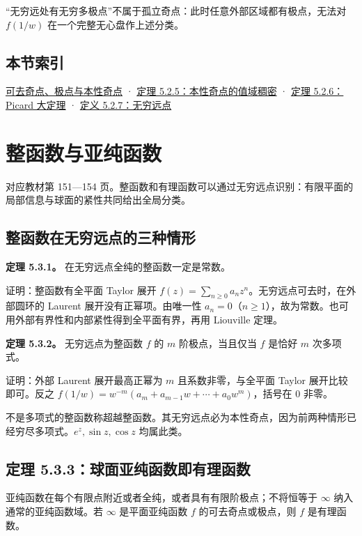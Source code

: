 \documentclass[11pt,a4paper]{article}
\begin{document}
``无穷远处有无穷多极点''不属于孤立奇点：此时任意外部区域都有极点，无法对
\(f(1/w)\) 在一个完整无心盘作上述分类。

\subsection{本节索引}\label{ch05-s2-heading-5}

\hyperref[ch05-s2-heading-1]{可去奇点、极点与本性奇点} ·
\hyperref[ch05-s2-heading-2]{定理 5.2.5：本性奇点的值域稠密} ·
\hyperref[ch05-s2-heading-3]{定理 5.2.6：Picard 大定理} ·
\hyperref[ch05-s2-heading-4]{定义 5.2.7：无穷远点}

\section{整函数与亚纯函数}
对应教材第 151---154
页。整函数和有理函数可以通过无穷远点识别：有限平面的局部信息与球面的紧性共同给出全局分类。

\subsection{整函数在无穷远点的三种情形}\label{ch05-s3-heading-1}

\textbf{定理 5.3.1。} 在无穷远点全纯的整函数一定是常数。

证明：整函数有全平面 Taylor 展开
\(f(z)=\sum_{n\ge0}a_nz^n\)。无穷远点可去时，在外部圆环的 Laurent
展开没有正幂项。由唯一性
\(a_n=0\)（\(n\ge1\)），故为常数。也可用外部有界性和内部紧性得到全平面有界，再用
Liouville 定理。

\textbf{定理 5.3.2。} 无穷远点为整函数 \(f\) 的 \(m\) 阶极点，当且仅当
\(f\) 是恰好 \(m\) 次多项式。

证明：外部 Laurent 展开最高正幂为 \(m\) 且系数非零，与全平面 Taylor
展开比较即可。反之 \(f(1/w)=w^{-m}(a_m+a_{m-1}w+\cdots+a_0w^m)\)，括号在
\(0\) 非零。

不是多项式的整函数称超越整函数。其无穷远点必为本性奇点，因为前两种情形已经穷尽多项式。\(e^z,\sin z,\cos z\)
均属此类。

\subsection{定理 5.3.3：球面亚纯函数即有理函数}\label{ch05-s3-heading-2}

亚纯函数在每个有限点附近或者全纯，或者具有有限阶极点；不将恒等于
\(\infty\) 纳入通常的亚纯函数域。若 \(\infty\) 是平面亚纯函数 \(f\)
的可去奇点或极点，则 \(f\) 是有理函数。
\end{document}
